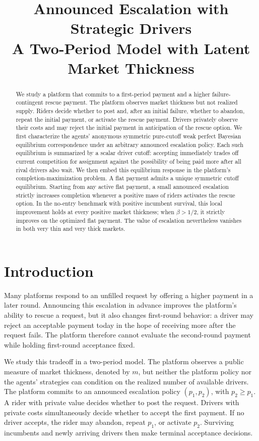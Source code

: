 \documentclass[11pt]{article}
\title{\bfseries Announced Escalation with Strategic Drivers\\
\large A Two-Period Model with Latent Market Thickness}
\author{}
\date{}
\theoremstyle{definition}
\theoremstyle{remark}
\begin{document}
\maketitle

\begin{abstract}
We study a platform that commits to a first-period payment and a higher
failure-contingent rescue payment.  The platform observes market thickness but
not realized supply.  Riders decide whether to post and, after an initial
failure, whether to abandon, repeat the initial payment, or activate the rescue
payment.  Drivers privately observe their costs and may reject the initial
payment in anticipation of the rescue option.  We first characterize the
agents' anonymous symmetric pure-cutoff weak perfect Bayesian equilibrium
correspondence under an arbitrary announced escalation policy.  Each such
equilibrium is summarized by a scalar driver cutoff:
accepting immediately trades off current competition for assignment against
the possibility of being paid more after all rival drivers also wait.  We then
embed this equilibrium response in the platform's completion-maximization
problem.  A flat payment admits a unique symmetric cutoff equilibrium.  Starting
from any active flat payment, a small announced escalation strictly increases
completion whenever a positive mass of riders activates the rescue option.  In
the no-entry benchmark with positive incumbent survival, this local improvement
holds at every positive market thickness; when \(\beta>1/2\), it strictly
improves on the optimized flat payment.  The value of escalation nevertheless
vanishes in both very thin and very thick markets.
\end{abstract}

\section{Introduction}

Many platforms respond to an unfilled request by offering a higher payment in a
later round.  Announcing this escalation in advance improves the platform's
ability to rescue a request, but it also changes first-round behavior: a driver
may reject an acceptable payment today in the hope of receiving more after the
request fails.  The platform therefore cannot evaluate the second-round
payment while holding first-round acceptance fixed.

We study this tradeoff in a two-period model.  The platform observes a public
measure of market thickness, denoted by \(m\), but neither the platform policy
nor the agents' strategies can condition on the realized number of available
drivers.  The platform commits to an announced escalation policy
\((p_1,p_2)\), with \(p_2\ge p_1\).  A rider with private value decides whether
to post the request.  Drivers with private costs simultaneously decide whether
to accept the first payment.  If no driver accepts, the rider may abandon,
repeat \(p_1\), or activate \(p_2\).  Surviving incumbents and newly arriving
drivers then make terminal acceptance decisions.
\end{document}
